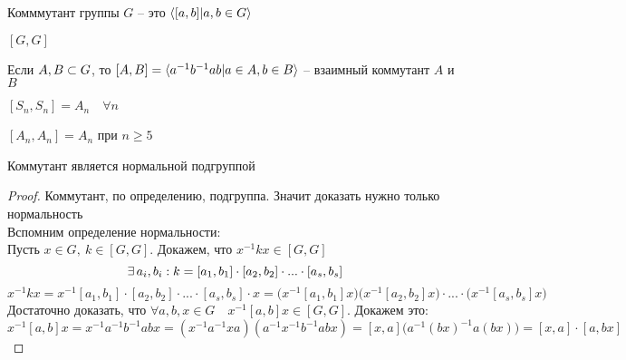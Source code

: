 \begin{definition}
    Комммутант группы $ G $ -- это $ \braket{[a, b] | a, b \in G} $
\end{definition}

\begin{notation}
	$ [G, G] $
\end{notation}

\begin{notation}
    Если $ A, B \subset G $, то $ [A, B] = \braket{a^{-1}b^{-1}ab | a \in A, b \in B} $ -- взаимный коммутант $ A $ и $ B $
\end{notation}

\begin{exmpls}
	\item $ [S_n, S_n] = A_n \quad \forall n $
    \item $ [A_n, A_n] = A_n $ при $ n \ge 5 $
\end{exmpls}

\begin{theorem}
	Коммутант является нормальной подгруппой
\end{theorem}

\begin{proof}
	Коммутант, по определению, подгруппа. Значит доказать нужно только нормальность \\
    Вспомним определение нормальности: \\
    Пусть $ x \in G, ~ k \in [G, G] $. Докажем, что $ x^{-1}kx \in [G, G] $
    $$ \exists\, a_i, b_i : k = [a_1, b_1] \cdot [a_2, b_2] \cdot ... \cdot [a_s, b_s] $$
    $$ x^{-1}kx = x^{-1}[a_1, b_1] \cdot [a_2, b_2] \cdot ... \cdot [a_s, b_s] \cdot x = \big( x^{-1}[a_1, b_1]x \big) \big( x^{-1}[a_2, b_2]x \big) \cdot ... \cdot \big(x^{-1}[a_s, b_s]x \big) $$
    Достаточно доказать, что $ \forall a, b, x \in G \quad x^{-1}[a, b]x \in [G, G] $. Докажем это:
    $$ x^{-1}[a, b]x = x^{-1}a^{-1}b^{-1}abx = (x^{-1}a^{-1}xa)(a^{-1}x^{-1}b^{-1}abx) = [x, a] \big( a^{-1}(bx)^{-1}a(bx) \big) = [x, a] \cdot [a, bx] $$
\end{proof}

